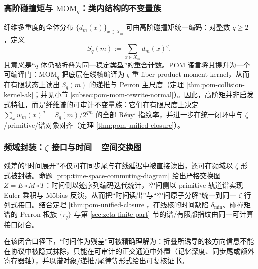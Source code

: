 \subsubsection{高阶碰撞矩与 \texorpdfstring{$\mathrm{MOM}_q$}{MOMq}：类内结构的不变量族}\label{subsubsec:frt-moments}
纤维多重度的全体分布 \(\{d_m(x)\}_{x\in X_m}\) 可由高阶碰撞矩统一编码：对整数 \(q\ge 2\)，定义
\[
S_q(m):=\sum_{x\in X_m}d_m(x)^q.
\]
其意义是“\(q\) 体仍被折叠为同一稳定类型”的重合计数。POM 语言将其提升为一个可编译门：\(\mathrm{MOM}_q\) 把底层在线核编译为 \(q\)-重 fiber-product moment-kernel，从而在有限状态上读出 \(S_q(m)\) 的递推与 Perron 主尺度（定理 \ref{thm:pom-collision-kernel-ak}；并见小节 \ref{subsec:pom-mom-rewrite-normal}）。因此，高阶矩并非启发式特征，而是纤维谱的可审计不变量族：它们在有限尺度上决定 \(\sum_x w_m(x)^q=S_q(m)/2^{qm}\) 的全部 Rényi 指纹率，并进一步在统一闭环中与 \(\zeta\)/primitive/谱对象对齐（定理 \ref{thm:pom-unified-closure}）。

\subsubsection{频域封装：\texorpdfstring{$\zeta$}{zeta} 接口与时间—空间交换图}\label{subsubsec:frt-zeta-packaging}
残差的“时间展开”不仅可在同步尾与在线延迟中被直接读出，还可在频域以 \(\zeta\) 形式被封装。命题 \ref{prop:time-space-commuting-diagram} 给出严格交换图 \(Z=E\circ M\circ T\)：时间侧以迹序列编码迭代统计，空间侧以 primitive 轨道谱实现 Euler 乘积与 Möbius 反演，从而把“时间读出”与“空间原子分解”统一到同一 \(\zeta\)-行列式接口。结合定理 \ref{thm:pom-unified-closure}，在线核的时间缺陷 \(\delta_{\min}\)、碰撞矩谱的 Perron 根族 \(\{r_q\}\) 与第 \ref{sec:zeta-finite-part} 节的谱/有限部指纹由同一可计算接口闭合。\par
在该闭合口径下，“时间作为残差”可被精确理解为：折叠所诱导的核方向信息不能在协议中被隐式抹除，只能在可审计的正交通道中外置（记忆深度、同步尾或额外寄存器轴），并以谱对象/递推/尾律等形式给出可复核证书。
